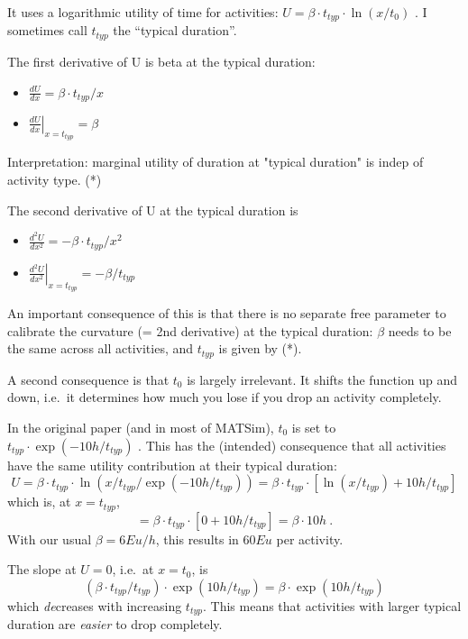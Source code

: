 It uses a logarithmic utility of time for activities: $U = \beta \cdot t_{typ} \cdot  \ln(x/t_0)$ . I sometimes call $t_{typ}$ the ``typical duration''.

The first derivative of U is beta at the typical duration:
\begin{itemize}
	\item 
$\displaystyle
\frac{dU}{dx} = \beta \cdot t_{typ} / x
$
	\item 
$\displaystyle
\left. \frac{dU}{dx}\right|_{x=t_{typ}} = \beta
$
\end{itemize}

Interpretation: marginal utility of duration at "typical duration" is indep of activity type. (*)

The second derivative of U at the typical duration is
\begin{itemize}
	\item 
$\displaystyle
\frac{d^2U}{dx^2} = - \beta \cdot t_{typ} / x^2
$
	\item 
$\displaystyle
\left. \frac{d^2U}{dx^2} \right|_{x=t_{typ}} = - \beta / t_{typ}
$
\end{itemize}

An  important consequence of this is that there is no separate  free  parameter to calibrate the curvature (= 2nd derivative) at the  typical  duration: $\beta$ needs to be the same across all activities, and  $t_{typ}$ is  given by (*).

A second consequence is that $t_0$ is largely  irrelevant. It  shifts the function up and down, i.e.\ it determines how  much you lose  if you drop an activity completely.

In the  original paper (and in most of MATSim), $t_0$ is set to $t_{typ} \cdot   \exp(-10h/t_{typ})$ . This has the (intended) consequence that all  activities  have the same utility contribution at their typical  duration:
\[
U = \beta \cdot t_{typ} \cdot \ln( x / t_{typ} / \exp(-10h/t_{typ}) ) 
%
= \beta \cdot t_{typ} \cdot [ \ln( x/t_{typ} ) + 10h/t_{typ} ]
\]
which   is, at $x=t_{typ}$,
\[
= \beta \cdot t_{typ} \cdot [ 0 + 10h/t_{typ} ] = \beta \cdot  10h \ . 
\]
With  our usual $\beta = 6Eu/h$, this results in $60Eu$ per  activity.

The slope at $U=0$, i.e.\ at $x=t_0$, is
\[
(\beta \cdot t_{typ} / t_{typ}) \cdot \exp( 10h/t_{typ}) = \beta \cdot \exp( 10h/t_{typ} )
\]
which \emph{de}creases with increasing $t_{typ}$. This means that activities with larger typical duration are \emph{easier} to drop completely.

